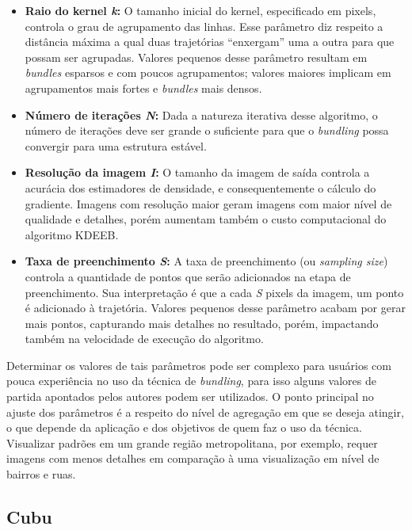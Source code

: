\begin{itemize}

\item{\textbf{Raio do kernel \emph{k}:}} O tamanho inicial do kernel, especificado em
pixels, controla o grau de agrupamento das linhas. Esse parâmetro diz respeito a
distância máxima a qual duas trajetórias ``enxergam'' uma a outra para que
possam ser agrupadas. Valores pequenos desse parâmetro resultam em
\emph{bundles} esparsos e com poucos agrupamentos; valores maiores implicam em
agrupamentos mais fortes e \emph{bundles} mais densos.

\item{\textbf{Número de iterações \emph{N}:}} Dada a natureza iterativa desse
algoritmo, o número de iterações deve ser grande o suficiente para que o
\emph{bundling} possa convergir para uma estrutura estável.

\item{\textbf{Resolução da imagem \emph{I}:}} O tamanho da imagem de saída controla a
acurácia dos estimadores de densidade, e consequentemente o cálculo do
gradiente. Imagens com resolução maior geram imagens com maior nível de
qualidade e detalhes, porém aumentam também o custo computacional do algoritmo KDEEB.

\item{\textbf{Taxa de preenchimento \emph{S}:}} A taxa de preenchimento (ou \emph{sampling size})
controla a quantidade de pontos que serão adicionados na etapa de preenchimento.
Sua interpretação é que a cada \emph{S} pixels da imagem, um
ponto é adicionado à trajetória. Valores pequenos desse parâmetro acabam
por gerar mais pontos, capturando mais detalhes no
resultado, porém, impactando também na velocidade de execução do algoritmo.

\end{itemize}

Determinar os valores de tais parâmetros pode ser complexo para usuários com
pouca experiência no uso da técnica de \emph{bundling}, para isso alguns
valores de partida apontados pelos autores podem ser utilizados. O ponto
principal no ajuste dos parâmetros é a respeito do nível de
agregação em que se deseja atingir, o que depende da aplicação e dos
objetivos de quem faz o uso da técnica. Visualizar padrões em um grande
região metropolitana, por exemplo, requer imagens com menos detalhes em
comparação à uma visualização em nível de bairros e ruas.

\subsection{Cubu}

